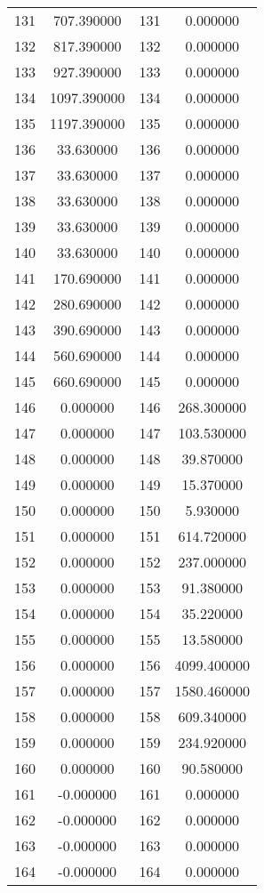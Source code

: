 \documentclass[12pt]{article}
\begin{document}
\begin{longtable}{@{}cccc@{}}
131 & 707.390000 & 131 & 0.000000 \\
132 & 817.390000 & 132 & 0.000000 \\
133 & 927.390000 & 133 & 0.000000 \\
134 & 1097.390000 & 134 & 0.000000 \\
135 & 1197.390000 & 135 & 0.000000 \\
136 & 33.630000 & 136 & 0.000000 \\
137 & 33.630000 & 137 & 0.000000 \\
138 & 33.630000 & 138 & 0.000000 \\
139 & 33.630000 & 139 & 0.000000 \\
140 & 33.630000 & 140 & 0.000000 \\
141 & 170.690000 & 141 & 0.000000 \\
142 & 280.690000 & 142 & 0.000000 \\
143 & 390.690000 & 143 & 0.000000 \\
144 & 560.690000 & 144 & 0.000000 \\
145 & 660.690000 & 145 & 0.000000 \\
146 & 0.000000 & 146 & 268.300000 \\
147 & 0.000000 & 147 & 103.530000 \\
148 & 0.000000 & 148 & 39.870000 \\
149 & 0.000000 & 149 & 15.370000 \\
150 & 0.000000 & 150 & 5.930000 \\
151 & 0.000000 & 151 & 614.720000 \\
152 & 0.000000 & 152 & 237.000000 \\
153 & 0.000000 & 153 & 91.380000 \\
154 & 0.000000 & 154 & 35.220000 \\
155 & 0.000000 & 155 & 13.580000 \\
156 & 0.000000 & 156 & 4099.400000 \\
157 & 0.000000 & 157 & 1580.460000 \\
158 & 0.000000 & 158 & 609.340000 \\
159 & 0.000000 & 159 & 234.920000 \\
160 & 0.000000 & 160 & 90.580000 \\
161 & -0.000000 & 161 & 0.000000 \\
162 & -0.000000 & 162 & 0.000000 \\
163 & -0.000000 & 163 & 0.000000 \\
164 & -0.000000 & 164 & 0.000000 \\

\end{longtable}
\end{document}
